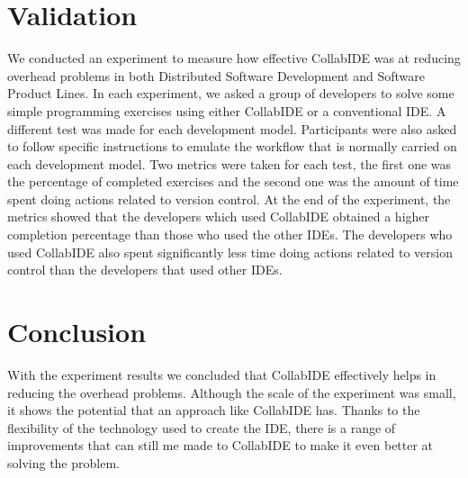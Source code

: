 \documentclass[draft]{llncs}
\begin{document}
\section{Validation}
\label{sec:validation}

We conducted an experiment to measure how effective CollabIDE was at reducing overhead problems 
in both Distributed Software Development and Software Product Lines. In each experiment, we asked 
a group of developers to solve some simple programming exercises using either CollabIDE or a 
conventional IDE. A different test was made for each development model. Participants were also 
asked to follow specific instructions to emulate the workflow that is normally carried on each 
development model. Two metrics were taken for each test, the first one was the percentage of 
completed exercises and the second one was the amount of time spent doing actions related to 
version control.
At the end of the experiment, the metrics showed that the developers which used CollabIDE obtained 
a higher completion percentage than those who used the other IDEs. The developers who used 
CollabIDE also spent significantly less time doing actions related to version control than the 
developers that used other IDEs.

\section{Conclusion}
\label{sec:conclusion}


With the experiment results we concluded that CollabIDE effectively helps in reducing the overhead 
problems. Although the scale of the experiment was small, it shows the potential that an approach like 
CollabIDE has. Thanks to the flexibility of the technology used to create the IDE, there is a range of 
improvements that can still me made to CollabIDE to make it even better at solving the problem.  


%


  
\end{document}
